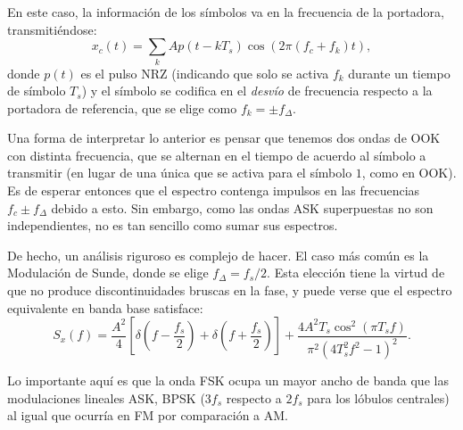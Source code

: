 \begin{ejemplo}
    En este caso, la información de los símbolos va en la frecuencia de la portadora, transmitiéndose:
    \begin{equation*}
        x_c(t) = \sum_k A p(t-kT_s) \cos(2\pi (f_c + f_k) t),
    \end{equation*}
donde $p(t)$ es el pulso NRZ (indicando que solo se activa $f_k$ durante un tiempo de símbolo $T_s$) y el símbolo se codifica en el \emph{desvío} de frecuencia respecto a la portadora de referencia, que se elige como $f_k=\pm f_\Delta$.

Una forma de interpretar lo anterior es pensar que tenemos dos ondas de OOK con distinta frecuencia, que se alternan en el tiempo de acuerdo al símbolo a transmitir (en lugar de una única que se activa para el símbolo $1$, como en OOK). Es de esperar entonces que el espectro contenga impulsos en las frecuencias $f_c\pm f_\Delta$ debido a esto. Sin embargo, como las ondas ASK superpuestas no son independientes, no es tan sencillo como sumar sus espectros.

De hecho, un análisis riguroso es complejo de hacer. El caso más común es la Modulación de Sunde, donde se elige $f_\Delta = f_s/2$. Esta elección tiene la virtud de que no produce discontinuidades bruscas en la fase, y puede verse que el espectro equivalente en banda base satisface:
\begin{equation*} 
    S_{x}(f) = \frac{A^2}{4}\left[\delta\left(f-\frac{f_s}{2}\right)+\delta\left(f+\frac{f_s}{2}\right)\right] + \frac{4 A^2 T_s \cos^2(\pi T_s f)}{\pi^2 (4 T_s^2 f^2 - 1)^2}.
\end{equation*}

\begin{center}
\end{center}

Lo importante aquí es que la onda FSK ocupa un mayor ancho de banda que las modulaciones lineales ASK, BPSK ($3f_s$ respecto a $2f_s$ para los lóbulos centrales) al igual que ocurría en FM por comparación a AM.


\end{ejemplo}
